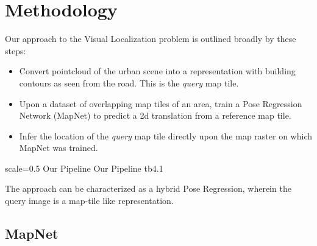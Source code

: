 

\chapter{Methodology}
Our approach to the Visual Localization problem is outlined broadly by these steps:
\begin{itemize}
	\item Convert pointcloud of the urban scene into a representation with building contours as seen from the road. This is the \emph{query} map tile.\\
	\item Upon a dataset of overlapping map tiles of an area, train a Pose Regression Network (MapNet) to predict a 2d translation from a reference map tile. \\
	\item Infer the location of the \emph{query} map tile directly upon the map raster on which MapNet was trained. \\  
\end{itemize}

{scale=0.5}%
{Our Pipeline}%
{Our Pipeline}%
{tb4.1} %

The approach can be characterized as a hybrid Pose Regression, wherein the query image is a map-tile like representation.


\section{MapNet}

